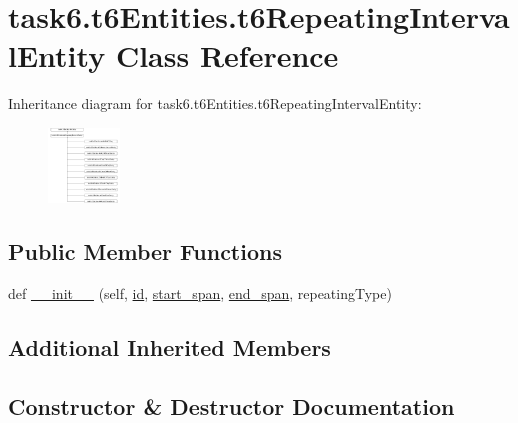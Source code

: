 \hypertarget{classtask6_1_1t6Entities_1_1t6RepeatingIntervalEntity}{}\section{task6.\+t6\+Entities.\+t6\+Repeating\+Interval\+Entity Class Reference}
\label{classtask6_1_1t6Entities_1_1t6RepeatingIntervalEntity}
Inheritance diagram for task6.\+t6\+Entities.\+t6\+Repeating\+Interval\+Entity\+:\begin{figure}[H]
\begin{center}
\leavevmode
\includegraphics[height=2.000000cm]{classtask6_1_1t6Entities_1_1t6RepeatingIntervalEntity}
\end{center}
\end{figure}
\subsection*{Public Member Functions}
\begin{DoxyCompactItemize}
\item 
def \hyperlink{classtask6_1_1t6Entities_1_1t6RepeatingIntervalEntity_a88197dfb2f859962cdc56bf5b4fb9c3f}{\+\_\+\+\_\+init\+\_\+\+\_\+} (self, \hyperlink{classtask6_1_1t6Entities_1_1t6Entity_a96b2e7fb553c920ab2db6f6deb31e3b4}{id}, \hyperlink{classtask6_1_1t6Entities_1_1t6Entity_a8221c36d2995a24200cdfbd74cc9233c}{start\+\_\+span}, \hyperlink{classtask6_1_1t6Entities_1_1t6Entity_a597d42bb02fc9f42277098f0ce21917c}{end\+\_\+span}, repeating\+Type)
\end{DoxyCompactItemize}
\subsection*{Additional Inherited Members}


\subsection{Constructor \& Destructor Documentation}
\mbox{\label{classtask6_1_1t6Entities_1_1t6RepeatingIntervalEntity_a88197dfb2f859962cdc56bf5b4fb9c3f}} 
